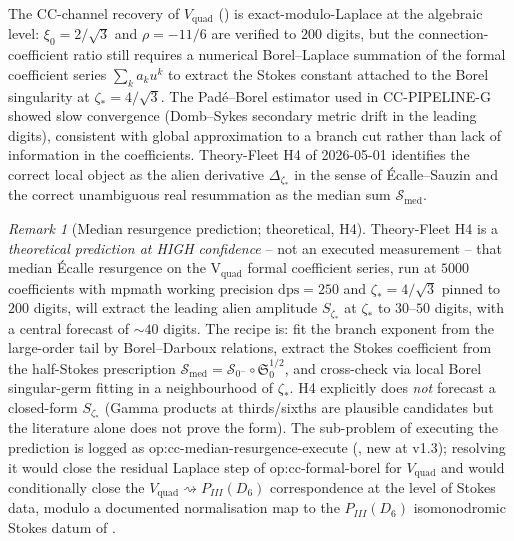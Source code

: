 \documentclass[11pt,reqno]{amsart}
\theoremstyle{plain}
\theoremstyle{definition}
\theoremstyle{remark}
\newtheorem{remark}[theorem]{Remark}
\newcommand{\CC}{\mathrm{CC}}
\newcommand{\Vquad}{V_{\mathrm{quad}}}
\begin{document}
The $\CC$-channel recovery of $\Vquad$
() is exact-modulo-Laplace at the
algebraic level: $\xi_0 = 2/\sqrt 3$ and $\rho = -11/6$ are
verified to $200$ digits, but the connection-coefficient
ratio still requires a numerical Borel--Laplace summation
of the formal coefficient series $\sum_{k} a_k u^k$ to
extract the Stokes constant attached to the Borel
singularity at $\zeta_* = 4/\sqrt 3$. The Pad\'e--Borel
estimator used in CC-PIPELINE-G \cite{siarc_cc_pipeline_g}
showed slow convergence (Domb--Sykes secondary metric drift
in the leading digits), consistent with global
approximation to a branch cut rather than lack of
information in the coefficients. Theory-Fleet H4 of
2026-05-01 \cite{siarc_theory_fleet_h4} identifies the
correct local object as the alien derivative
$\Delta_{\zeta_*}$ in the sense of \'Ecalle--Sauzin
\cite{ecalle1981fonctions, sauzin2014resurgent,
mitschi2016divergent} and the correct unambiguous real
resummation as the median sum
$\mathcal S_{\mathrm{med}}$.

\begin{remark}[Median resurgence prediction; theoretical, H4]
\label{rem:h4-median}
Theory-Fleet H4 \cite{siarc_theory_fleet_h4} is a
\emph{theoretical prediction at HIGH confidence} -- not an
executed measurement -- that median \'Ecalle resurgence on
the V$_{\mathrm{quad}}$ formal coefficient series, run at
$5000$ coefficients with mpmath working precision
$\mathrm{dps} = 250$ and $\zeta_* = 4/\sqrt 3$ pinned to
$200$ digits, will extract the leading alien amplitude
$S_{\zeta_*}$ at $\zeta_*$ to $30$--$50$ digits, with a
central forecast of $\sim 40$ digits. The recipe is: fit
the branch exponent from the large-order tail by
Borel--Darboux relations, extract the Stokes coefficient
from the half-Stokes prescription
$\mathcal S_{\mathrm{med}} = \mathcal S_{0^-} \circ
\mathfrak S_0^{1/2}$, and cross-check via local Borel
singular-germ fitting in a neighbourhood of $\zeta_*$.
H4 explicitly does \emph{not} forecast a closed-form
$S_{\zeta_*}$ (Gamma products at thirds/sixths are
plausible candidates but the literature alone does not
prove the form). The sub-problem of executing the
prediction is logged as
\textsf{op:cc-median-resurgence-execute}
(, new at v1.3); resolving it would close
the residual Laplace step of \textsf{op:cc-formal-borel}
for $V_{\mathrm{quad}}$ and would conditionally close the
$\Vquad \rightsquigarrow P_{III}(D_6)$ correspondence at
the level of Stokes data, modulo a documented
normalisation map to the $P_{III}(D_6)$ isomonodromic
Stokes datum of \cite{lodayrichaud2016divergent,
boalch2001stokes}.
\end{remark}
\end{document}

